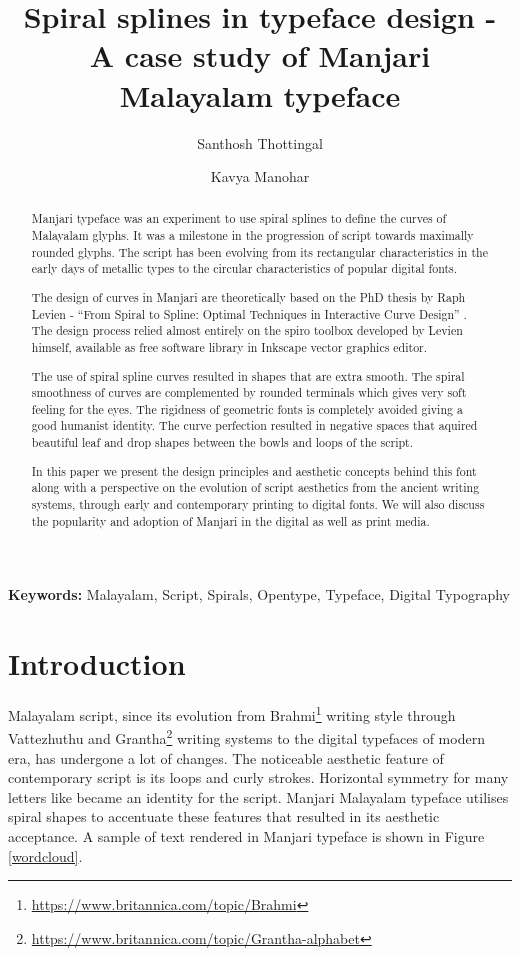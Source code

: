\documentclass[10pt]{article}
\title{Spiral splines in typeface design - A case study of Manjari Malayalam typeface}
\author{ 
 Santhosh Thottingal
 \and
 Kavya Manohar
}
\begin{document}
\maketitle

\begin{abstract}

Manjari typeface was an experiment to use spiral splines to define the curves of Malayalam glyphs. It was a milestone in the progression of script towards maximally rounded glyphs. The script has been evolving from its rectangular characteristics in the early days of metallic types to the circular characteristics of popular digital fonts. 

The design of curves in Manjari are theoretically based on the PhD thesis by Raph Levien - ``From Spiral to Spline: Optimal Techniques in Interactive Curve Design” \cite{levien}. The design process relied almost entirely on the spiro toolbox developed by Levien himself, available as free software library in Inkscape vector graphics editor.

The use of spiral spline curves resulted in shapes that are extra smooth. The spiral smoothness of curves are complemented by rounded terminals which gives very soft feeling for the eyes. The rigidness of geometric fonts is completely avoided giving a good humanist identity. The curve perfection resulted in negative spaces that aquired beautiful leaf and drop shapes between the bowls and loops of the script. 

In this paper we present the design principles and aesthetic concepts behind this font along with a perspective on the evolution of script aesthetics from the ancient writing systems, through early and contemporary printing to digital fonts. We will also discuss the popularity and adoption of Manjari in the digital as well as print media.
\end{abstract}

\textbf{Keywords:} Malayalam, Script, Spirals, Opentype, Typeface, Digital Typography

\section{Introduction}

Malayalam script, since its evolution from Brahmi\footnote{\url{https://www.britannica.com/topic/Brahmi}} writing style through Vattezhuthu and Grantha\footnote{\url{https://www.britannica.com/topic/Grantha-alphabet}} writing systems to the digital typefaces of modern era, has undergone a lot of changes. The noticeable aesthetic feature of contemporary script is its loops and curly strokes. Horizontal symmetry for many letters like {} became an identity for the script. Manjari Malayalam typeface utilises spiral shapes to accentuate these features that resulted in its aesthetic acceptance. A sample of text rendered in Manjari typeface is shown in Figure \ref{wordcloud}.
\end{document}
